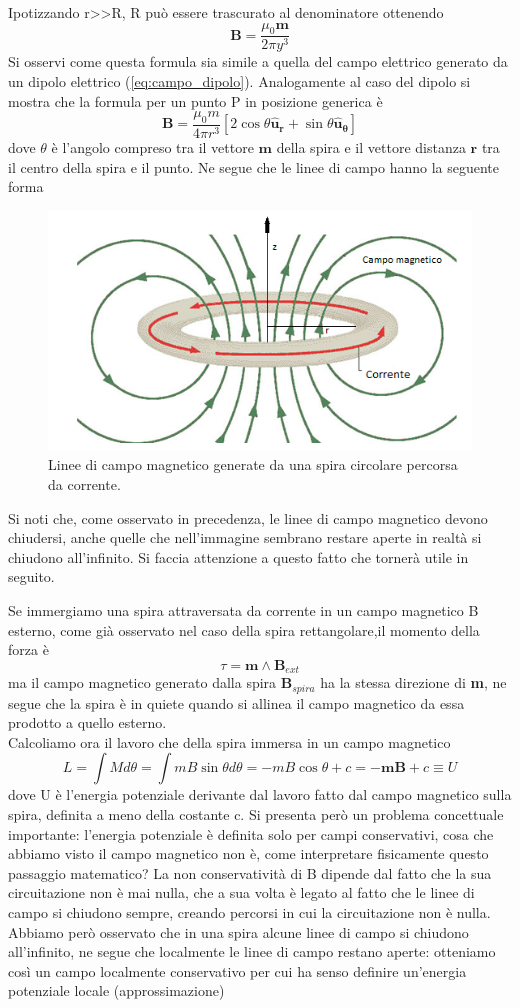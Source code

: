 \documentclass[
10pt, %
a4paper, %
oneside, %
headinclude,footinclude, %
BCOR5mm, %
]{scrartcl}
\begin{document}
\begin{esercizio}
Ipotizzando r>>R, R può essere trascurato al denominatore ottenendo 
\[\mathbf{B}=\frac{\mu_0 \mathbf{m}}{2\pi y^{3}}\]
Si osservi come questa formula sia simile a quella del campo elettrico generato da un dipolo elettrico (\ref{eq:campo_dipolo}). Analogamente al caso del dipolo si mostra che la formula per un punto P in posizione generica è  
\[\mathbf{B}=\frac{\mu_0 m }{4\pi r^3}[2\cos\theta\mathbf{\hat{u}_r}+\sin\theta\mathbf{\hat{u}_{\theta}}]\]
dove $\theta$ è l'angolo compreso tra il vettore \(\mathbf{m}\) della spira e il vettore distanza \(\mathbf{r}\) tra il centro della spira e il punto. Ne segue che le linee di campo hanno la seguente forma
\begin{figure}[h!]
	\centering
	\includegraphics[width=0.7\linewidth]{../images/linee_campo_magnetico_spira}
	\caption{Linee di campo magnetico generate da una spira circolare percorsa da corrente.}
	\label{fig:lineecampomagneticospira}
\end{figure}
\FloatBarrier
Si noti che, come osservato in precedenza, le linee di campo magnetico devono chiudersi, anche quelle che nell'immagine sembrano restare aperte in realtà si chiudono all'infinito. Si faccia attenzione a questo fatto che tornerà utile in seguito.  
\end{esercizio}
Se immergiamo una spira attraversata da corrente in un campo magnetico B esterno, come già osservato nel caso della spira rettangolare,il momento della forza è 
\[\tau = \mathbf{m}\wedge\mathbf{B}_{ext}\]
ma il campo magnetico generato dalla spira \(\mathbf{B}_{spira}\) ha la stessa direzione di \textbf{m}, ne segue che la spira è in quiete quando si allinea il campo magnetico da essa prodotto a quello esterno.\\
Calcoliamo ora il lavoro che della spira immersa in un campo magnetico
\[L = \int M d\theta= \int m B \sin\theta d\theta= -mB\cos\theta + c= -\mathbf{m}\mathbf{B}+c \equiv U\]
dove U è l'energia potenziale derivante dal lavoro fatto dal campo magnetico sulla spira, definita a meno della costante c. Si presenta però un problema concettuale importante: l'energia potenziale è definita solo per campi conservativi, cosa che abbiamo visto il campo magnetico non è, come interpretare fisicamente questo passaggio matematico? La non conservatività di B dipende dal fatto che la sua circuitazione non è mai nulla, che a sua volta è legato al fatto che le linee di campo si chiudono sempre, creando percorsi in cui la circuitazione non è nulla. Abbiamo però osservato che in una spira alcune linee di campo si chiudono all'infinito, ne segue che localmente le linee di campo restano aperte: otteniamo così un campo localmente conservativo per cui ha senso definire un'energia potenziale locale (approssimazione)\\ 
\end{document}
